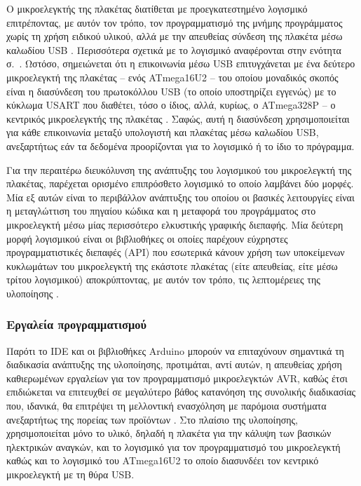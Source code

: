 Ο μικροελεγκτής της πλακέτας  διατίθεται με
προεγκατεστημένο
λογισμικό  επιτρέποντας, με αυτόν τον τρόπο, τον προγραμματισμό
της μνήμης προγράμματος χωρίς τη χρήση ειδικού υλικού, αλλά με την απευθείας
σύνδεση της πλακέτα μέσω καλωδίου USB \parencite{arduino:environ}. Περισσότερα
σχετικά με το λογισμικό  αναφέρονται στην ενότητα
 σ.~\pageref{subsec:avr:progmem}.
Ωστόσο, σημειώνεται ότι η
επικοινωνία μέσω USB επιτυγχάνεται με ένα δεύτερο μικροελεγκτή της πλακέτας --
ενός ATmega16U2 -- του οποίου μοναδικός σκοπός είναι η διασύνδεση του
πρωτοκόλλου USB (το οποίο υποστηρίζει εγγενώς) με το κύκλωμα USART που διαθέτει,
τόσο ο ίδιος, αλλά, κυρίως, ο ATmega328P -- ο κεντρικός μικροελεγκτής της
πλακέτας \parencites{arduino:uno}[148,185]{atmel12}[172]{atmel13}. Σαφώς, αυτή η
διασύνδεση χρησιμοποιείται για κάθε επικοινωνία μεταξύ υπολογιστή και πλακέτας
μέσω καλωδίου USB, ανεξαρτήτως εάν τα δεδομένα προορίζονται για το λογισμικό
 ή το ίδιο το πρόγραμμα.

Για την περαιτέρω διευκόλυνση της ανάπτυξης του λογισμικού του μικροελεγκτή της
πλακέτας,
παρέχεται ορισμένο επιπρόσθετο λογισμικό  το οποίο λαμβάνει δύο
μορφές. Μία εξ αυτών είναι το περιβάλλον ανάπτυξης  του οποίου
οι βασικές λειτουργίες είναι η μεταγλώττιση του πηγαίου κώδικα και η μεταφορά
του προγράμματος στο μικροελεγκτή \parencite{arduino:environ} μέσω μίας
περισσότερο ελκυστικής γραφικής διεπαφής. Μία δεύτερη μορφή
λογισμικού είναι οι βιβλιοθήκες  οι οποίες παρέχουν εύχρηστες
προγραμματιστικές διεπαφές (API) που εσωτερικά κάνουν χρήση των υποκείμενων
κυκλωμάτων του μικροελεγκτή της εκάστοτε πλακέτας (είτε απευθείας, είτε μέσω
τρίτου λογισμικού) αποκρύπτοντας, με αυτόν τον τρόπο, τις λεπτομέρειες της
υλοποίησης \parencite{arduino:lib}.


\subsubsection{Εργαλεία προγραμματισμού}
\label{subsubsec:avr:toolchain}

Παρότι το IDE και οι βιβλιοθήκες Arduino μπορούν να επιταχύνουν σημαντικά τη
διαδικασία ανάπτυξης της υλοποίησης, προτιμάται, αντί αυτών, η απευθείας χρήση
καθιερωμένων εργαλείων για τον προγραμματισμό μικροελεγκτών AVR, καθώς έτσι
επιδιώκεται να επιτευχθεί σε μεγαλύτερο βάθος κατανόηση της συνολικής
διαδικασίας που, ιδανικά, θα επιτρέψει τη μελλοντική ενασχόληση με παρόμοια
συστήματα ανεξαρτήτως της πορείας των προϊόντων . Στο πλαίσιο της
υλοποίησης, χρησιμοποιείται μόνο το υλικό, δηλαδή η πλακέτα  για την
κάλυψη των βασικών ηλεκτρικών αναγκών, και το λογισμικό  για τον
προγραμματισμό του μικροελεγκτή καθώς και το λογισμικό του ATmega16U2 το οποίο
διασυνδέει τον κεντρικό μικροελεγκτή με τη θύρα USB.

